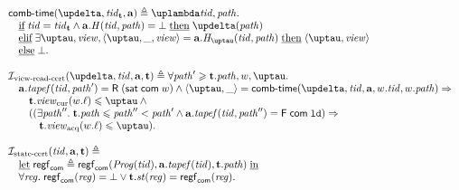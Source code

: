 \[\begin{array}{l}
\deltaHmap(\delta, \tId_{\tT}, \aT) \triangleq \lambda \tId, \cpath. \\
  \quad \textIf \tId = \tId_{\tT} \land \aT.\hmap(\tId, \cpath) = \bot \; \textThen \delta(\cpath) \\
  \quad \textElif \exists \tau, \R, \angled{\tau, \_, \R} = \aT.\tmap(\tId, \cpath) \; \textThen \angled{\tau, \R} \\
  \quad \textElse \bot. \\
\\
\invViewReadCERT(\delta, \tId, \aT, \tT) \triangleq
  \forall \cpath' \ge \tT.\cpath, \w, \tau. \\
\quad \aT.\tapef(\tId, \cpath') = \tapeRead{(\tapeSatisfied{\Committed}{\w})} \land
   \angled{\tau, \_} = \deltaHmap(\delta, \tId, \aT, \w.\tId, \w.\cpath) \Rightarrow \\
\qquad \tT.\Rcur(\w.\loc) \le \tau \land {} \\
\qquad ((\exists \cpath''. \; \tT.\cpath \le \cpath'' < \cpath' \land 
             \aT.\tapef(\tId, \cpath'') = \tapeFence{\Committed}{\LD}) \Rightarrow \\
             \qquad \quad \tT.\Racq(\w.\loc) \le \tau). \\
\\
\invStateCERT(\tId, \aT, \tT) \triangleq \\
\quad \textLet \regstcom \triangleq \regstcom(\Cfarm(\tId), \aT.\tapef(\tId), \tT.\cpath) \; \textIn \\
\quad \forall \reg. \; \regstcom(\reg) = \bot \lor \tT.\PromState(\reg) = \regstcom(\reg).\\
\end{array}\]

